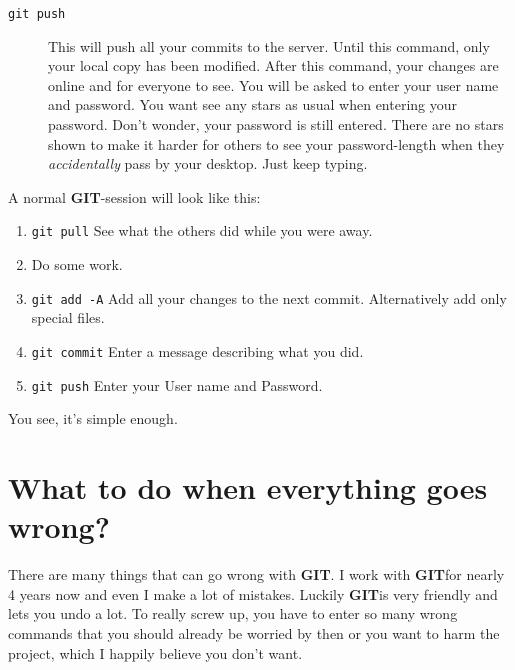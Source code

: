 \documentclass[a4paper]{article}
\newcommand{\git}{\textbf{GIT}}
\begin{document}
\begin{description}
	\item[\texttt{git push}] This will push all your commits to the server. Until this command, only your local copy has been modified. After this command, your changes are online and for everyone to see. You will be asked to enter your user name and password. You want see any stars as usual when entering your password. Don't wonder, your password is still entered. There are no stars shown to make it harder for others to see your password-length when they \textit{accidentally} pass by your desktop. Just keep typing.
\end{description}

A normal \git -session will look like this:\\
\begin{enumerate}
	\item \texttt{git pull} See what the others did while you were away.
	\item Do some work.
	\item \texttt{git add -A} Add all your changes to the next commit. Alternatively add only special files.
	\item \texttt{git commit} Enter a message describing what you did.
	\item \texttt{git push} Enter your User name and Password.
\end{enumerate}
You see, it's simple enough.

\newpage

\section{What to do when everything goes wrong?}

There are many things that can go wrong with \git . I work with \git for nearly 4 years now and even I make a lot of mistakes. Luckily \git is very friendly and lets you undo a lot. To really screw up, you have to enter so many wrong commands that you should already be worried by then or you want to harm the project, which I happily believe you don't want.
\end{document}
